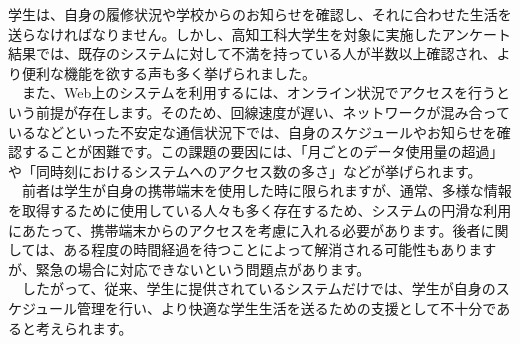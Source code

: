 学生は、自身の履修状況や学校からのお知らせを確認し、それに合わせた生活を送らなければなりません。しかし、高知工科大学生を対象に実施したアンケート結果では、既存のシステムに対して不満を持っている人が半数以上確認され、より便利な機能を欲する声も多く挙げられました。\\
　また、Web上のシステムを利用するには、オンライン状況でアクセスを行うという前提が存在します。そのため、回線速度が遅い、ネットワークが混み合っているなどといった不安定な通信状況下では、自身のスケジュールやお知らせを確認することが困難です。この課題の要因には、「月ごとのデータ使用量の超過」や「同時刻におけるシステムへのアクセス数の多さ」などが挙げられます。\\
　前者は学生が自身の携帯端末を使用した時に限られますが、通常、多様な情報を取得するために使用している人々も多く存在するため、システムの円滑な利用にあたって、携帯端末からのアクセスを考慮に入れる必要があります。後者に関しては、ある程度の時間経過を待つことによって解消される可能性もありますが、緊急の場合に対応できないという問題点があります。\\
　したがって、従来、学生に提供されているシステムだけでは、学生が自身のスケジュール管理を行い、より快適な学生生活を送るための支援として不十分であると考えられます。
